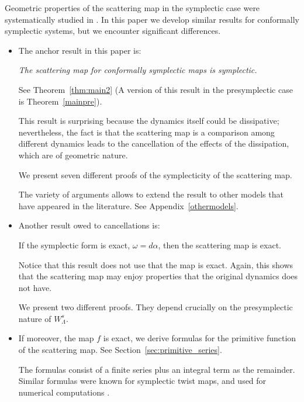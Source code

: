 \documentclass[11pt]{amsart}
\theoremstyle{definition}
\theoremstyle{remark}
\numberwithin{equation}{section}
\begin{document}
     Geometric properties of the scattering map in the symplectic case
     were systematically studied in \cite{DLS08}. In this
     paper we  develop  similar results
     for conformally symplectic systems, but we encounter significant differences.


\begin{itemize}



   \item
     The anchor result in this paper is:

\medskip

     \emph{The scattering map  for conformally symplectic maps is symplectic.}

\medskip

      See Theorem~\ref{thm:main2} (A version of this result in the presymplectic case is Theorem~\ref{mainpre}).

     This result is surprising because the dynamics itself could be dissipative;
     nevertheless, the fact is that the scattering map is a comparison
     among different dynamics leads to the cancellation  of the effects of the dissipation,  which are of geometric nature.

     We present seven different proofs of the symplecticity of
     the scattering map.

     The variety of arguments
     allows to extend the result to other models
     that have appeared in
     the literature. See Appendix~\ref{othermodels}.


     \item
       Another result owed to cancellations is:

     If the symplectic form is exact, $\omega = d \alpha$, then
     the scattering map is exact.

     Notice that this result does not use that the map is exact. Again, this shows
     that the scattering map may enjoy properties that the original dynamics does not have.

     We  present two different proofs. They depend crucially on
     the presymplectic nature of $W^s_\Lambda$.

   \item
     If moreover, the map $f$ is exact, we derive formulas for the primitive
     function of the scattering map. See Section~\ref{sec:primitive_series}.

     The formulas consist of a finite series plus an integral term as the remainder.
     Similar formulas were known for symplectic twist maps, and  used
     for numerical computations \cite{Tabacman95}.


\end{itemize}
\end{document}

